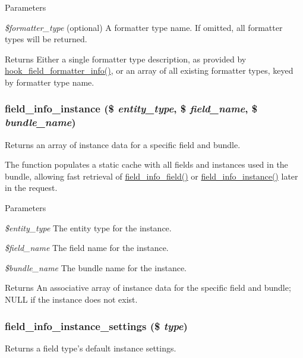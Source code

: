 \begin{DoxyParams}{Parameters}
\item[{\em \$formatter\_\-type}](optional) A formatter type name. If omitted, all formatter types will be returned.\end{DoxyParams}
\begin{DoxyReturn}{Returns}
Either a single formatter type description, as provided by \hyperlink{group__field__formatter_ga2f5aa1c7455f55dffd84a48efa57f987}{hook\_\-field\_\-formatter\_\-info()}, or an array of all existing formatter types, keyed by formatter type name. 
\end{DoxyReturn}
\hypertarget{group__field__info_ga7d4361ece7a9a8be980e3fd4a6307564}{
\subsubsection[{field\_\-info\_\-instance}]{\setlength{\rightskip}{0pt plus 5cm}field\_\-info\_\-instance (\$ {\em entity\_\-type}, \/  \$ {\em field\_\-name}, \/  \$ {\em bundle\_\-name})}}
\label{group__field__info_ga7d4361ece7a9a8be980e3fd4a6307564}
Returns an array of instance data for a specific field and bundle.

The function populates a static cache with all fields and instances used in the bundle, allowing fast retrieval of \hyperlink{group__field__info_ga74cfc942cd2baa5c49780b08c5d357d4}{field\_\-info\_\-field()} or \hyperlink{group__field__info_ga7d4361ece7a9a8be980e3fd4a6307564}{field\_\-info\_\-instance()} later in the request.


\begin{DoxyParams}{Parameters}
\item[{\em \$entity\_\-type}]The entity type for the instance. \item[{\em \$field\_\-name}]The field name for the instance. \item[{\em \$bundle\_\-name}]The bundle name for the instance.\end{DoxyParams}
\begin{DoxyReturn}{Returns}
An associative array of instance data for the specific field and bundle; NULL if the instance does not exist. 
\end{DoxyReturn}
\hypertarget{group__field__info_gacc329d37a5cdf35417a3415d9686f37a}{
\subsubsection[{field\_\-info\_\-instance\_\-settings}]{\setlength{\rightskip}{0pt plus 5cm}field\_\-info\_\-instance\_\-settings (\$ {\em type})}}
\label{group__field__info_gacc329d37a5cdf35417a3415d9686f37a}
Returns a field type's default instance settings.


